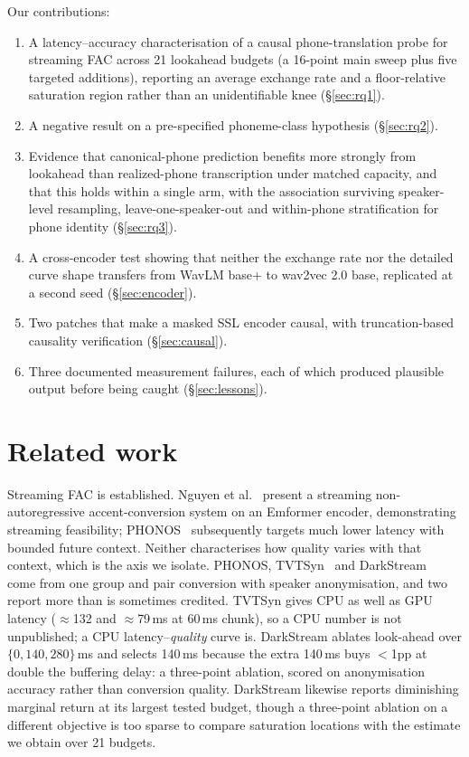 \documentclass[journal]{IEEEtran}
\begin{document}
Our contributions:
\begin{enumerate}\itemsep1pt
\item A latency--accuracy characterisation of a causal phone-translation probe
      for streaming FAC across 21 lookahead budgets (a 16-point main sweep
      plus five targeted additions), reporting an average
      exchange rate and a floor-relative saturation region rather than an
      unidentifiable knee (\S\ref{sec:rq1}).
\item A negative result on a pre-specified phoneme-class hypothesis
      (\S\ref{sec:rq2}).
\item Evidence that canonical-phone prediction benefits more strongly from
      lookahead than realized-phone transcription under matched capacity, and
      that this holds within a single arm, with the association surviving
      speaker-level resampling, leave-one-speaker-out and within-phone
      stratification for
      phone identity (\S\ref{sec:rq3}).
\item A cross-encoder test showing that neither the exchange rate nor the
      detailed curve shape transfers from WavLM base+ to wav2vec 2.0 base,
      replicated at a second seed (\S\ref{sec:encoder}).
\item Two patches that make a masked SSL encoder causal, with
      truncation-based causality verification (\S\ref{sec:causal}).
\item Three documented measurement failures, each of which produced plausible
      output before being caught (\S\ref{sec:lessons}).
\end{enumerate}

\section{Related work}

Streaming FAC is established. Nguyen et al.~\cite{nguyen2025streaming} present
a streaming non-autoregressive accent-conversion system on an Emformer encoder,
demonstrating streaming feasibility; PHONOS~\cite{phonos2026}
subsequently targets much lower latency with bounded future context. Neither
characterises how quality varies with that context, which is the axis we
isolate. PHONOS, TVTSyn~\cite{tvtsyn2026} and DarkStream~\cite{darkstream2025}
come from one group and pair conversion with speaker anonymisation, and two
report more than is sometimes credited. TVTSyn gives CPU as well as GPU latency
($\approx$132 and $\approx$79\,ms at 60\,ms chunk), so a CPU number is not
unpublished; a CPU latency--\emph{quality} curve is. DarkStream ablates
look-ahead over $\{0,140,280\}$\,ms and selects 140\,ms because the extra
140\,ms buys $<$1pp at double the buffering delay: a three-point ablation,
scored on anonymisation accuracy rather than conversion quality. DarkStream
likewise reports diminishing marginal return at its largest tested budget,
though a three-point ablation on a different objective is too sparse to compare
saturation locations with the estimate we obtain over 21 budgets.
\end{document}
